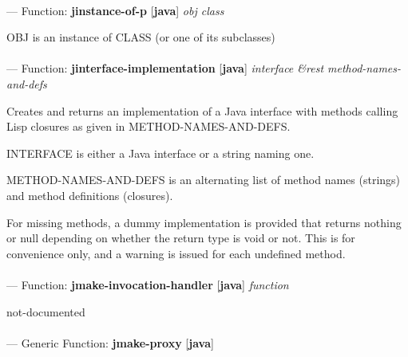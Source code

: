 \paragraph{}
\label{JAVA:JINSTANCE-OF-P}
--- Function: \textbf{jinstance-of-p} [\textbf{java}] \textit{obj class}

\begin{adjustwidth}{5em}{5em}
OBJ is an instance of CLASS (or one of its subclasses)
\end{adjustwidth}

\paragraph{}
\label{JAVA:JINTERFACE-IMPLEMENTATION}
--- Function: \textbf{jinterface-implementation} [\textbf{java}] \textit{interface \&rest method-names-and-defs}

\begin{adjustwidth}{5em}{5em}
Creates and returns an implementation of a Java interface with
   methods calling Lisp closures as given in METHOD-NAMES-AND-DEFS.

   INTERFACE is either a Java interface or a string naming one.

   METHOD-NAMES-AND-DEFS is an alternating list of method names
   (strings) and method definitions (closures).

   For missing methods, a dummy implementation is provided that
   returns nothing or null depending on whether the return type is
   void or not. This is for convenience only, and a warning is issued
   for each undefined method.
\end{adjustwidth}

\paragraph{}
\label{JAVA:JMAKE-INVOCATION-HANDLER}
--- Function: \textbf{jmake-invocation-handler} [\textbf{java}] \textit{function}

\begin{adjustwidth}{5em}{5em}
not-documented
\end{adjustwidth}

\paragraph{}
\label{JAVA:JMAKE-PROXY}
--- Generic Function: \textbf{jmake-proxy} [\textbf{java}] \textit{}

